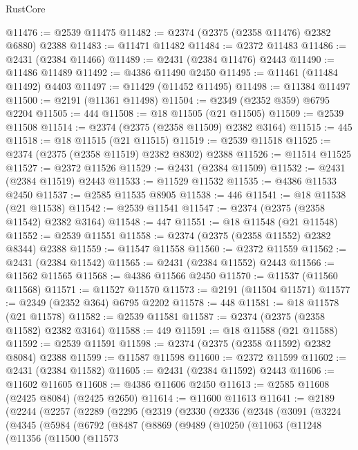 \begin{lexlean}{RustCore}
\begin{coremodule}
@11476 := @2539 @11475
@11482 := @2374 (@2375 (@2358 @11476) @2382 @6880) @2388
@11483 := @11471 @11482
@11484 := @2372 @11483
@11486 := @2431 (@2384 @11466)
@11489 := @2431 (@2384 @11476) @2443
@11490 := @11486 @11489
@11492 := @4386 @11490 @2450
@11495 := @11461 (@11484 @11492) @4403
@11497 := @11429 (@11452 @11495)
@11498 := @11384 @11497
@11500 := @2191 (@11361 @11498)
@11504 := @2349 (@2352 @359) @6795 @2204
@11505 := 444
@11508 := @18 @11505 (@21 @11505)
@11509 := @2539 @11508
@11514 := @2374 (@2375 (@2358 @11509) @2382 @3164)
@11515 := 445
@11518 := @18 @11515 (@21 @11515)
@11519 := @2539 @11518
@11525 := @2374 (@2375 (@2358 @11519) @2382 @8302) @2388
@11526 := @11514 @11525
@11527 := @2372 @11526
@11529 := @2431 (@2384 @11509)
@11532 := @2431 (@2384 @11519) @2443
@11533 := @11529 @11532
@11535 := @4386 @11533 @2450
@11537 := @2585 @11535 @8905
@11538 := 446
@11541 := @18 @11538 (@21 @11538)
@11542 := @2539 @11541
@11547 := @2374 (@2375 (@2358 @11542) @2382 @3164)
@11548 := 447
@11551 := @18 @11548 (@21 @11548)
@11552 := @2539 @11551
@11558 := @2374 (@2375 (@2358 @11552) @2382 @8344) @2388
@11559 := @11547 @11558
@11560 := @2372 @11559
@11562 := @2431 (@2384 @11542)
@11565 := @2431 (@2384 @11552) @2443
@11566 := @11562 @11565
@11568 := @4386 @11566 @2450
@11570 := @11537 (@11560 @11568)
@11571 := @11527 @11570
@11573 := @2191 (@11504 @11571)
@11577 := @2349 (@2352 @364) @6795 @2202
@11578 := 448
@11581 := @18 @11578 (@21 @11578)
@11582 := @2539 @11581
@11587 := @2374 (@2375 (@2358 @11582) @2382 @3164)
@11588 := 449
@11591 := @18 @11588 (@21 @11588)
@11592 := @2539 @11591
@11598 := @2374 (@2375 (@2358 @11592) @2382 @8084) @2388
@11599 := @11587 @11598
@11600 := @2372 @11599
@11602 := @2431 (@2384 @11582)
@11605 := @2431 (@2384 @11592) @2443
@11606 := @11602 @11605
@11608 := @4386 @11606 @2450
@11613 := @2585 @11608 (@2425 @8084) (@2425 @2650)
@11614 := @11600 @11613
@11641 := @2189
    (@2244
      (@2257
        (@2289
          (@2295
            (@2319
              (@2330
                (@2336
                  (@2348
                    (@3091
                      (@3224
                        (@4345
                          (@5984
                            (@6792
                              (@8487
                                (@8869
                                  (@9489
                                    (@10250
                                      (@11063
                                        (@11248
                                          (@11356
                                            (@11500
                                              (@11573

\end{coremodule}
\end{lexlean}
